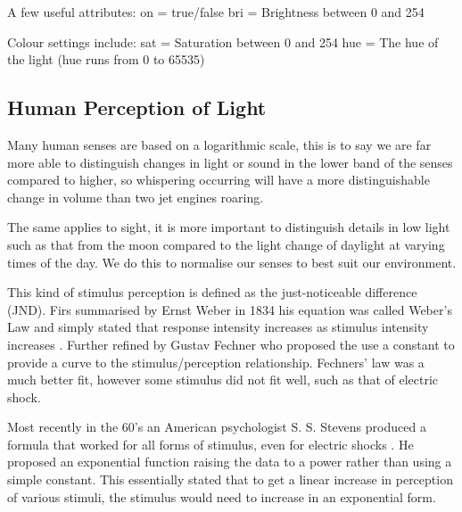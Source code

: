A few useful attributes: on = true/false bri = Brightness between 0 and
254

Colour settings include: sat = Saturation between 0 and 254 hue = The
hue of the light (hue runs from 0 to 65535)

\subsection{Human Perception of Light}\label{human-perception-of-light}

Many human senses are based on a logarithmic scale, this is to say we
are far more able to distinguish changes in light or sound in the lower
band of the senses compared to higher, so whispering occurring will have
a more distinguishable change in volume than two jet engines roaring.

The same applies to sight, it is more important to distinguish details
in low light such as that from the moon compared to the light change of
daylight at varying times of the day. We do this to normalise our senses
to best suit our environment.

This kind of stimulus perception is defined as the just-noticeable
difference (JND). Firs summarised by Ernst Weber in 1834 his equation
was called Weber's Law and simply stated that response intensity
increases as stimulus intensity increases
\parencite[p. 1613-1615]{salkind2010encyclopedia}. Further refined by
Gustav Fechner who proposed the use a constant to provide a curve to the
stimulus/perception relationship. Fechners' law was a much better fit,
however some stimulus did not fit well, such as that of electric shock.

Most recently in the 60's an American psychologist S. S. Stevens
produced a formula that worked for all forms of stimulus, even for
electric shocks \parencite{stevens1957psychophysical}. He proposed an
exponential function raising the data to a power rather than using a
simple constant. This essentially stated that to get a linear increase
in perception of various stimuli, the stimulus would need to increase in
an exponential form.
